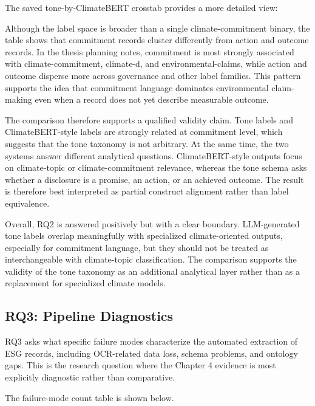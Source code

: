 \documentclass[english, online, cse, master]{dithesis}
\begin{document}
The saved tone-by-ClimateBERT crosstab provides a more detailed view:

Although the label space is broader than a single climate-commitment binary, the table shows that commitment records cluster differently from action and outcome records. In the thesis planning notes, commitment is most strongly associated with climate-commitment, climate-d, and environmental-claims, while action and outcome disperse more across governance and other label families. This pattern supports the idea that commitment language dominates environmental claim-making even when a record does not yet describe measurable outcome.

The comparison therefore supports a qualified validity claim. Tone labels and ClimateBERT-style labels are strongly related at commitment level, which suggests that the tone taxonomy is not arbitrary. At the same time, the two systems answer different analytical questions. ClimateBERT-style outputs focus on climate-topic or climate-commitment relevance, whereas the tone schema asks whether a disclosure is a promise, an action, or an achieved outcome. The result is therefore best interpreted as partial construct alignment rather than label equivalence.

Overall, RQ2 is answered positively but with a clear boundary. LLM-generated tone labels overlap meaningfully with specialized climate-oriented outputs, especially for commitment language, but they should not be treated as interchangeable with climate-topic classification. The comparison supports the validity of the tone taxonomy as an additional analytical layer rather than as a replacement for specialized climate models.

\subsection{RQ3: Pipeline Diagnostics}

RQ3 asks what specific failure modes characterize the automated extraction of ESG records, including OCR-related data loss, schema problems, and ontology gaps. This is the research question where the Chapter 4 evidence is most explicitly diagnostic rather than comparative.

The failure-mode count table is shown below.
\end{document}
